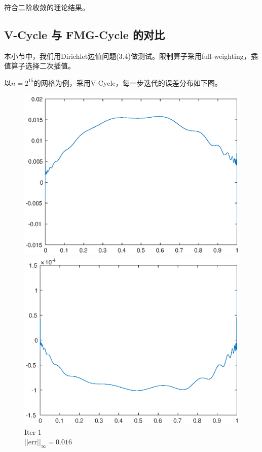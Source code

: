 \documentclass[lang=cn,10pt]{elegantbook}
\begin{document}
符合二阶收敛的理论结果。

\subsection{V-Cycle 与 FMG-Cycle 的对比}

本小节中，我们用Dirichlet边值问题(3.4)做测试。限制算子采用full-weighting，插值算子选择二次插值。

以$n=2^{15}$的网格为例，采用V-Cycle，每一步迭代的误差分布如下图。

\begin{figure}[H]
  \centering
  \begin{minipage}[t]{0.24\linewidth}
      \centering
      \includegraphics[width=0.9\linewidth]{figure/1-4-1.eps}
      \caption*{\small Iter 1 \\ $||\text{err}||_\infty=0.016$}
  \end{minipage}
  \begin{minipage}[t]{0.24\linewidth}
    \centering
    \includegraphics[width=0.9\linewidth]{figure/1-4-2.eps}

\end{minipage}
\end{figure}
\end{document}
